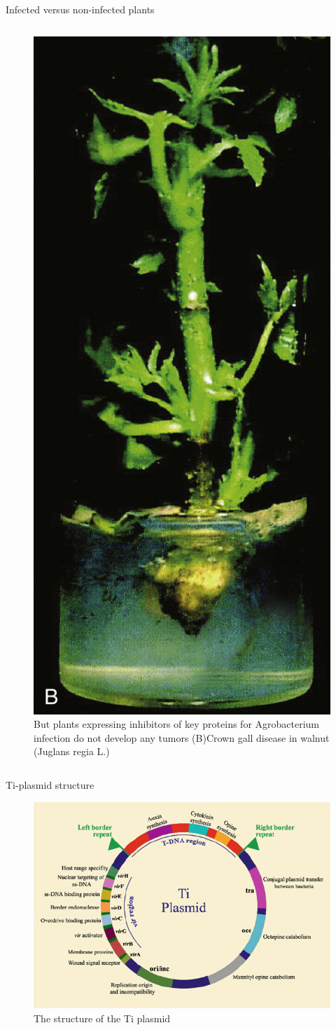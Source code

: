 \documentclass[11pt,dvipsnames,ignorenonframetext,aspectratio=169]{beamer}
\begin{document}
\begin{frame}{Infected versus non-infected plants}
\begin{columns}[T,onlytextwidth]
\begin{figure}
\includegraphics[width=0.4\linewidth]{../images/agrobacterium_gall_b} \caption{But plants expressing inhibitors of key proteins for Agrobacterium infection do not develop any tumors (B)\newline Crown gall disease in walnut (Juglans regia L.)}\label{fig:agrobacterium-gall2}
\end{figure}
    
\end{columns}
\end{frame}

\begin{frame}{Ti-plasmid structure}
\protect\hypertarget{ti-plasmid-structure}{}
\begin{figure}
\includegraphics[width=0.5\linewidth]{../images/Ti_plasmid} \caption{The structure of the Ti plasmid}\label{fig:ti-plasmid}
\end{figure}
\end{frame}
\end{document}
